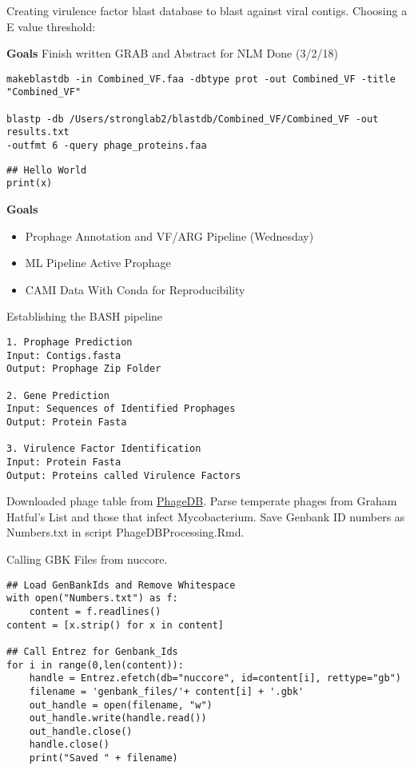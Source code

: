 \documentclass[idxtotoc,hyperref,openany]{labbook} %
\begin{document}
Creating virulence factor blast database to blast against viral contigs. Choosing a E value threshold:


\textbf{Goals}
Finish written GRAB and Abstract for NLM
Done (3/2/18)


\begin{verbatim}
makeblastdb -in Combined_VF.faa -dbtype prot -out Combined_VF -title "Combined_VF"

blastp -db /Users/stronglab2/blastdb/Combined_VF/Combined_VF -out results.txt
-outfmt 6 -query phage_proteins.faa
\end{verbatim}


\begin{lstlisting}
## Hello World 
print(x)
\end{lstlisting} 






\textbf{Goals}
\begin{itemize}
\item Prophage Annotation and VF/ARG Pipeline (Wednesday)
\item ML Pipeline Active Prophage
\item CAMI Data With Conda for Reproducibility
\end{itemize}

Establishing the BASH pipeline

\begin{verbatim}
1. Prophage Prediction
Input: Contigs.fasta
Output: Prophage Zip Folder

2. Gene Prediction
Input: Sequences of Identified Prophages
Output: Protein Fasta

3. Virulence Factor Identification
Input: Protein Fasta
Output: Proteins called Virulence Factors

\end{verbatim}



Downloaded phage table from \href{http://phagesdb.org/data/}{PhageDB}. Parse temperate phages from Graham Hatful's List and those that infect Mycobacterium. Save Genbank ID numbers as Numbers.txt in script PhageDBProcessing.Rmd.



Calling GBK Files from nuccore. 

\begin{lstlisting}
## Load GenBankIds and Remove Whitespace
with open("Numbers.txt") as f:
    content = f.readlines()
content = [x.strip() for x in content]

## Call Entrez for Genbank_Ids
for i in range(0,len(content)):
    handle = Entrez.efetch(db="nuccore", id=content[i], rettype="gb")
    filename = 'genbank_files/'+ content[i] + '.gbk'
    out_handle = open(filename, "w")
    out_handle.write(handle.read())
    out_handle.close()
    handle.close()
    print("Saved " + filename)
\end{lstlisting} 
\end{document}

